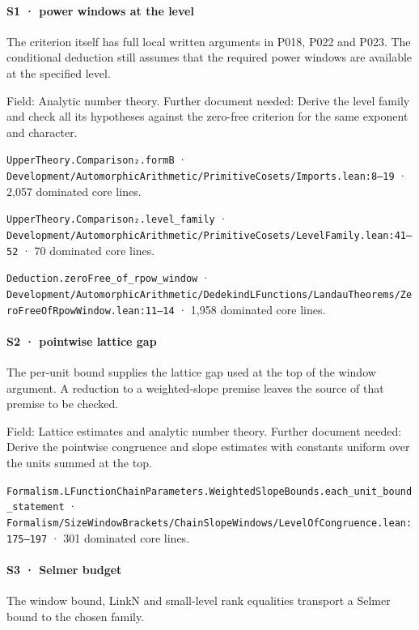 \paragraph{S1 · power windows at the level}

The criterion itself has full local written arguments in P018, P022 and P023. The conditional deduction still assumes that the required power windows are available at the specified level.

Field: Analytic number theory. Further document needed: Derive the level family and check all its hypotheses against the zero-free criterion for the same exponent and character.

\nolinkurl{UpperTheory.Comparison₂.formB} · \nolinkurl{Development/AutomorphicArithmetic/PrimitiveCosets/Imports.lean:8–19} · 2,057 dominated core lines.

\nolinkurl{UpperTheory.Comparison₂.level_family} · \nolinkurl{Development/AutomorphicArithmetic/PrimitiveCosets/LevelFamily.lean:41–52} · 70 dominated core lines.

\nolinkurl{Deduction.zeroFree_of_rpow_window} · \nolinkurl{Development/AutomorphicArithmetic/DedekindLFunctions/LandauTheorems/ZeroFreeOfRpowWindow.lean:11–14} · 1,958 dominated core lines.

\paragraph{S2 · pointwise lattice gap}

The per-unit bound supplies the lattice gap used at the top of the window argument. A reduction to a weighted-slope premise leaves the source of that premise to be checked.

Field: Lattice estimates and analytic number theory. Further document needed: Derive the pointwise congruence and slope estimates with constants uniform over the units summed at the top.

\nolinkurl{Formalism.LFunctionChainParameters.WeightedSlopeBounds.each_unit_bound_statement} · \nolinkurl{Formalism/SizeWindowBrackets/ChainSlopeWindows/LevelOfCongruence.lean:175–197} · 301 dominated core lines.

\paragraph{S3 · Selmer budget}

The window bound, LinkN and small-level rank equalities transport a Selmer bound to the chosen family.

